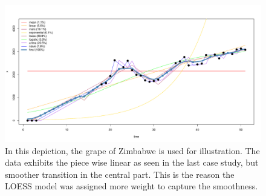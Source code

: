 \documentclass[nojss]{jss}\usepackage[]{graphicx}\usepackage[]{color}
\makeatletter
\def\maxwidth{ %
  \ifdim\Gin@nat@width>\linewidth
    \linewidth
  \else
    \Gin@nat@width
  \fi
}
\newenvironment{knitrout}{}{} %
\makeatother
\begin{document}
\begin{knitrout}
\color{fgcolor}\begin{figure}[!ht]


{\centering \includegraphics[width=\maxwidth]{figure/grape-zimbabwe} 

}

\caption[In this depiction, the grape of Zimbabwe is used for illustration]{In this depiction, the grape of Zimbabwe is used for illustration. The data exhibits the piece wise linear as seen in the last case study, but smoother transition in the central part. This is the reason the LOESS model was assigned more weight to capture the smoothness.\label{fig:grape-zimbabwe}}
\end{figure}


\end{knitrout}
\end{document}

